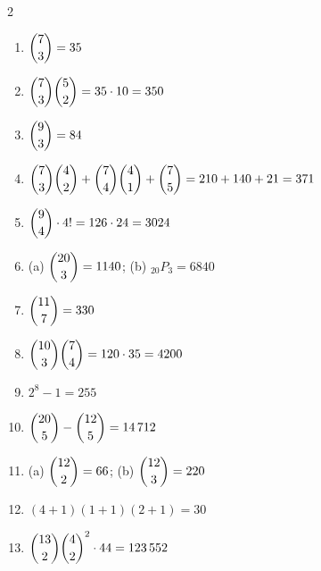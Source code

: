 \documentclass[11pt]{article}
\begin{document}
\begin{keybox}
\begin{multicols}{2}
\small
\begin{enumerate}[leftmargin=*,itemsep=3pt]
  \item $\dbinom{7}{3}=35$
  \item $\dbinom{7}{3}\dbinom{5}{2}=35\cdot10=350$
  \item $\dbinom{9}{3}=84$
  \item $\dbinom{7}{3}\dbinom{4}{2}+\dbinom{7}{4}\dbinom{4}{1}+\dbinom{7}{5}=210+140+21=371$
  \item $\dbinom{9}{4}\cdot4!=126\cdot24=3024$
  \item (a) $\dbinom{20}{3}=1140$; (b) $_{20}P_3=6840$
  \item $\dbinom{11}{7}=330$
  \item $\dbinom{10}{3}\dbinom{7}{4}=120\cdot35=4200$
  \item $2^8-1=255$
  \item $\dbinom{20}{5}-\dbinom{12}{5}=14\,712$
  \item (a) $\dbinom{12}{2}=66$; (b) $\dbinom{12}{3}=220$
  \item $(4{+}1)(1{+}1)(2{+}1)=30$
  \item $\dbinom{13}{2}\dbinom{4}{2}^2\cdot44=123\,552$
\end{enumerate}
\end{multicols}
\end{keybox}
\end{document}
